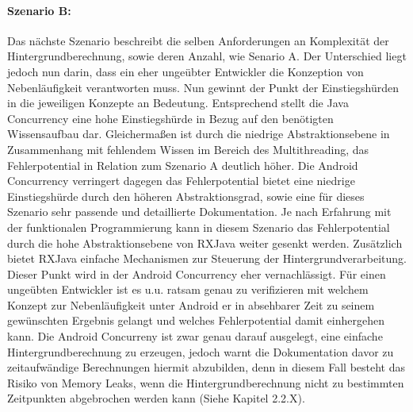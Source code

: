 \documentclass[12pt,oneside,a4paper,bibtotoc,liststotoc]{scrreprt}
\begin{document}
\paragraph{Szenario B:}
Das nächste Szenario beschreibt die selben Anforderungen an Komplexität der Hintergrundberechnung, sowie deren Anzahl, wie Senario A. Der Unterschied liegt jedoch nun darin, dass ein eher ungeübter Entwickler die Konzeption von Nebenläufigkeit verantworten muss. Nun gewinnt der Punkt der Einstiegshürden in die jeweiligen Konzepte an Bedeutung. Entsprechend stellt die Java Concurrency eine hohe Einstiegshürde in Bezug auf den benötigten Wissensaufbau dar. Gleichermaßen ist durch die niedrige Abstraktionsebene in Zusammenhang mit fehlendem Wissen im Bereich des Multithreading, das Fehlerpotential in Relation zum Szenario A deutlich höher.
Die Android Concurrency verringert dagegen das Fehlerpotential bietet eine niedrige Einstiegshürde durch den höheren Abstraktionsgrad, sowie eine für dieses Szenario sehr passende und detaillierte Dokumentation.
Je nach Erfahrung mit der funktionalen Programmierung kann in diesem Szenario das Fehlerpotential durch die hohe Abstraktionsebene von RXJava weiter gesenkt werden. Zusätzlich bietet RXJava einfache Mechanismen zur Steuerung der Hintergrundverarbeitung. Dieser Punkt wird in der Android Concurrency eher vernachlässigt.
Für einen ungeübten Entwickler ist es u.u. ratsam genau zu verifizieren mit welchem Konzept zur Nebenläufigkeit unter Android er in absehbarer Zeit zu seinem gewünschten Ergebnis gelangt und welches Fehlerpotential damit einhergehen kann. Die Android Concurreny ist zwar genau darauf ausgelegt, eine einfache Hintergrundberechnung zu erzeugen, jedoch warnt die Dokumentation davor zu zeitaufwändige Berechnungen hiermit abzubilden, denn in diesem Fall besteht das Risiko von Memory Leaks, wenn die Hintergrundberechnung nicht zu bestimmten Zeitpunkten abgebrochen werden kann (Siehe Kapitel 2.2.X).
\end{document}

